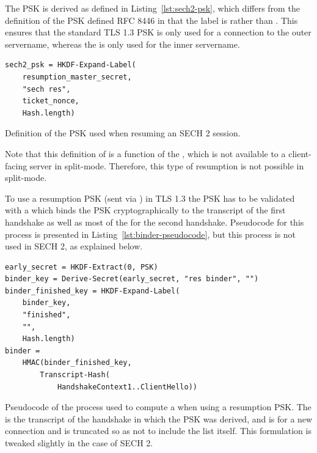 The PSK is derived as defined in Listing~\ref{lst:sech2-psk}, which differs from the definition of the PSK defined RFC 8446 in that the label is  rather than . This ensures that the standard TLS 1.3 PSK is only used for a connection to the outer servername, whereas the  is only used for the inner servername.
\begin{listing}
\begin{verbatim}
sech2_psk = HKDF-Expand-Label(
    resumption_master_secret,
    "sech res",
    ticket_nonce,
    Hash.length)
\end{verbatim}
\caption{\label{lst:sech2-psk}Definition of the PSK used when resuming an SECH 2 session.}
\end{listing}

Note that this definition of  is a function of the , which is not available to a client-facing server in split-mode.
Therefore, this type of resumption is not possible in split-mode. %

To use a resumption PSK (sent via ) in TLS 1.3 the PSK has to be validated with a  which binds the PSK cryptographically to the transcript of the first handshake as well as most of the  for the second handshake. Pseudocode for this process is presented in Listing~\ref{lst:binder-pseudocode}, but this process is not used in SECH 2, as explained below.

\begin{listing}
    \begin{verbatim}
early_secret = HKDF-Extract(0, PSK)
binder_key = Derive-Secret(early_secret, "res binder", "")
binder_finished_key = HKDF-Expand-Label(
    binder_key,
    "finished",
    "",
    Hash.length)
binder =
    HMAC(binder_finished_key,
        Transcript-Hash(
            HandshakeContext1..ClientHello))
    \end{verbatim}
    \captionsetup{width=.8\linewidth} 
    \caption{\label{lst:binder-pseudocode}Pseudocode of the process used to compute a  when using a resumption PSK. The  is the transcript of the handshake in which the PSK was derived, and  is for a new connection and is truncated so as not to include the  list itself. This formulation is tweaked slightly in the case of SECH 2.}
\end{listing}

